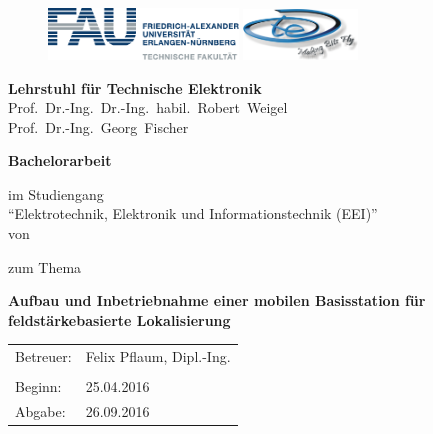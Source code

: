 \begin{titlepage}
\begin{figure}
\includegraphics[width=0.45\textwidth]{Abbildungen/Logo/FAUlogo}\hfill
\includegraphics[width=0.27\textwidth]{Abbildungen/Logo/LTElogo}
\end{figure}
\hspace{0.1cm}	
\center
\LARGE
	\textbf{Lehrstuhl für Technische Elektronik} \\
	Prof.~Dr.-Ing.~Dr.-Ing.~habil.~Robert~Weigel	\\
	Prof.~Dr.-Ing.~Georg~Fischer\\
\vspace{1cm}	

\LARGE
	\textbf{Bachelorarbeit}
\vspace{0.9cm}

\large
im Studiengang\\ \enquote{Elektrotechnik, Elektronik und Informationstechnik (EEI)}\\
\vspace{0.5cm}
von
\vspace{0.5cm}

\LARGE{
\authorname}
\vspace{0.7cm}

\large
zum Thema
\vspace{0.9cm}

\LARGE
\textbf{Aufbau und Inbetriebnahme einer mobilen Basisstation für 
feldstärkebasierte Lokalisierung}
\vspace{1.7cm}

\large
\begin{tabular}{ll}
Betreuer: & Felix Pflaum, Dipl.-Ing. \\
 &\\
Beginn: & 25.04.2016\\
Abgabe: & 26.09.2016\\
\end{tabular}
\end{titlepage}
